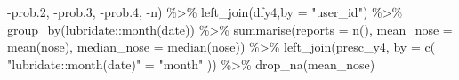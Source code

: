 \documentclass[
]{article}
\newenvironment{Shaded}{\begin{snugshade}}{\end{snugshade}}
\newcommand{\AttributeTok}[1]{\textcolor[rgb]{0.77,0.63,0.00}{#1}}
\newcommand{\FloatTok}[1]{\textcolor[rgb]{0.00,0.00,0.81}{#1}}
\newcommand{\FunctionTok}[1]{\textcolor[rgb]{0.00,0.00,0.00}{#1}}
\newcommand{\NormalTok}[1]{#1}
\newcommand{\OtherTok}[1]{\textcolor[rgb]{0.56,0.35,0.01}{#1}}
\newcommand{\SpecialCharTok}[1]{\textcolor[rgb]{0.00,0.00,0.00}{#1}}
\newcommand{\StringTok}[1]{\textcolor[rgb]{0.31,0.60,0.02}{#1}}
\begin{document}
\begin{Shaded}
\begin{Highlighting}[]
                 \SpecialCharTok{{-}}\NormalTok{prob}\FloatTok{.2}\NormalTok{,}
                 \SpecialCharTok{{-}}\NormalTok{prob}\FloatTok{.3}\NormalTok{,}
                 \SpecialCharTok{{-}}\NormalTok{prob}\FloatTok{.4}\NormalTok{,}
                 \SpecialCharTok{{-}}\NormalTok{n) }\SpecialCharTok{\%\textgreater{}\%} 
   \FunctionTok{left\_join}\NormalTok{(dfy4,}\AttributeTok{by =} \StringTok{"user\_id"}\NormalTok{) }\SpecialCharTok{\%\textgreater{}\%}  
   \FunctionTok{group\_by}\NormalTok{(lubridate}\SpecialCharTok{::}\FunctionTok{month}\NormalTok{(date)) }\SpecialCharTok{\%\textgreater{}\%}
   \FunctionTok{summarise}\NormalTok{(}\AttributeTok{reports =} \FunctionTok{n}\NormalTok{(),}
             \AttributeTok{mean\_nose =} \FunctionTok{mean}\NormalTok{(nose),}
             \AttributeTok{median\_nose =} \FunctionTok{median}\NormalTok{(nose)) }\SpecialCharTok{\%\textgreater{}\%}
   \FunctionTok{left\_join}\NormalTok{(presc\_y4, }\AttributeTok{by =} \FunctionTok{c}\NormalTok{( }\StringTok{"lubridate::month(date)"} \OtherTok{=} \StringTok{"month"}\NormalTok{ )) }\SpecialCharTok{\%\textgreater{}\%} 
   \FunctionTok{drop\_na}\NormalTok{(mean\_nose) }
 

\end{Highlighting}
\end{Shaded}
\end{document}
